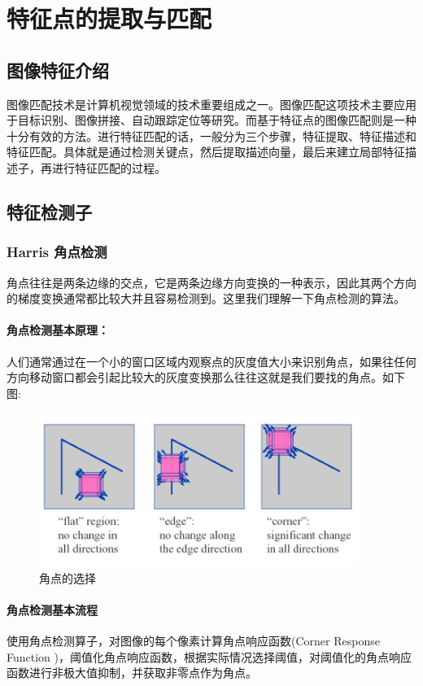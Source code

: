 \chapter{特征点的提取与匹配}
\section{图像特征介绍}
图像匹配技术是计算机视觉领域的技术重要组成之一。图像匹配这项技术主要应用于目标识别、图像拼接、自动跟踪定位等研究。而基于特征点的图像匹配则是一种十分有效的方法。进行特征匹配的话，一般分为三个步骤，特征提取、特征描述和特征匹配。具体就是通过检测关键点，然后提取描述向量，最后来建立局部特征描述子，再进行特征匹配的过程。
\section{特征检测子}
\subsection{Harris 角点检测}
角点往往是两条边缘的交点，它是两条边缘方向变换的一种表示，因此其两个方向的梯度变换通常都比较大并且容易检测到。这里我们理解一下角点检测的算法。\par
\subsubsection{角点检测基本原理：}\par
人们通常通过在一个小的窗口区域内观察点的灰度值大小来识别角点，如果往任何方向移动窗口都会引起比较大的灰度变换那么往往这就是我们要找的角点。如下图:\par
\begin{figure}[htbp]
\centering
\includegraphics[height=5cm]{figures/Harris1.png}
\caption{角点的选择}
\end{figure}
\subsubsection{角点检测基本流程}
使用角点检测算子，对图像的每个像素计算角点响应函数(Corner Response Function )，阈值化角点响应函数，根据实际情况选择阈值，对阈值化的角点响应函数进行非极大值抑制，并获取非零点作为角点。
